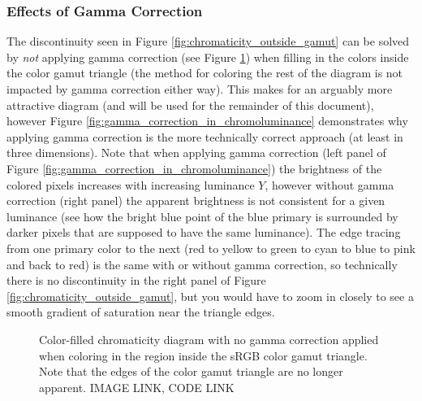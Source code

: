\documentclass[twocolumn]{article}
\newif\ifinvert
\begin{document}
\subsubsection{Effects of Gamma Correction}
The discontinuity seen in Figure \ref{fig:chromaticity_outside_gamut} can be solved by \textit{not} applying gamma correction (see Figure \ref{fig:chromaticity_without_gamma_correction}) when filling in the colors inside the color gamut triangle (the method for coloring the rest of the diagram is not impacted by gamma correction either way).  This makes for an arguably more attractive diagram (and will be used for the remainder of this document), however Figure \ref{fig:gamma_correction_in_chromoluminance} demonstrates why applying gamma correction is the more technically correct approach (at least in three dimensions).  Note that when applying gamma correction (left panel of Figure \ref{fig:gamma_correction_in_chromoluminance}) the brightness of the colored pixels increases with increasing luminance $Y$, however without gamma correction (right panel) the apparent brightness is not consistent for a given luminance (see how the bright blue point of the blue primary is surrounded by darker pixels that are supposed to have the same luminance).  The edge tracing from one primary color to the next (red to yellow to green to cyan to blue to pink and back to red) is the same with or without gamma correction, so technically there is no discontinuity in the right panel of Figure \ref{fig:chromaticity_outside_gamut}, but you would have to zoom in closely to see a smooth gradient of saturation near the triangle edges.
\begin{figure}[h]
    \ifinvert
        
    \else
        
    \fi
    \caption{Color-filled chromaticity diagram with no gamma correction applied when coloring in the region inside the sRGB color gamut triangle.  Note that the edges of the color gamut triangle are no longer apparent.  IMAGE LINK, CODE LINK}\label{fig:chromaticity_without_gamma_correction}
\end{figure}
\begin{figure*}[h]
    \ifinvert
        
    \else
        
    \fi
    \caption{Saturated surfaces transformed into $(x,y,Y)$ chromoluminance space with (left panel) and without (right panel) gamma correction applied.  With gamma correction the apparent brightness of pixels increases with luminance $Y$ uniformly around the color gamut volume.  Without gamma correction the sides generally appear darker, yet the brightness is still high near the primary colors creating variation in apparent brightness around what should be a path of constant luminance.  IMAGE LINK, CODE LINK}\label{fig:gamma_correction_in_chromoluminance}
\end{figure*}
\end{document}
